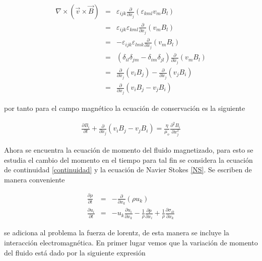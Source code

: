 \begin{eqnarray}
\nabla\times(\vec{v}\times\vec{B}) &=& \varepsilon_{ijk}\frac{\partial}{\partial x_{j}}(\varepsilon_{kml}v_{m}B_{l})\\
&=&\varepsilon_{ijk}\varepsilon_{kml}\frac{\partial}{\partial x_{j}}(v_{m}B_{l})\\
&=&-\varepsilon_{ijk}\varepsilon_{lmk}\frac{\partial}{\partial x_{j}}(v_{m}B_{l})\\
&=&(\delta_{il}\delta_{jm}-\delta_{im}\delta_{jl})\frac{\partial}{\partial x_{j}}(v_{m}B_{l})\\
&=&\frac{\partial}{\partial x_{j}}(v_{i}B_{j})-\frac{\partial}{\partial x_{j}}(v_{j}B_{i})\\
&=&\frac{\partial}{\partial x_{j}}(v_{i}B_{j}-v_{j}B_{i})
\end{eqnarray}

\noindent por tanto para el campo magnético  la ecuación de conservación es la siguiente 

\begin{eqnarray}
\boxed{
\frac{\partial B_{i}}{\partial t} + \frac{\partial}{\partial x_{j}}(v_{i}B_{j}-v_{j}B_{i}) = \frac{\eta}{\mu_{o}}\frac{\partial^{2}B_{i}}{\partial x_{j}^{2}}
}
\end{eqnarray}



\noindent Ahora se encuentra la ecuación de momento del fluido magnetizado, para esto se estudia el cambio del momento en el tiempo para tal fin se considera la ecuación de continuidad \eqref{continuidad} y la ecuación de Navier Stokes \eqref{NS}. Se escriben de manera conveniente

\begin{eqnarray}
\label{contindicial}
\frac{\partial \rho}{\partial t}&=&-\frac{\partial}{\partial x_{k}}(\rho u_{k})\\
\label{NSindicial}
\frac{\partial u_{i}}{\partial t} &=& -u_{k}\frac{\partial u_{i}}{\partial x_{k}} - \frac{1}{\rho}\frac{\partial p}{\partial x_{i}} + \frac{1}{\rho}\frac{\partial \sigma_{ik}}{\partial x_{k}}
\end{eqnarray}



\noindent se adiciona al problema la fuerza de lorentz, de esta manera se incluye la interacción electromagnética. En primer lugar vemos que la variación de momento del fluido está dado por la siguiente expresión 

